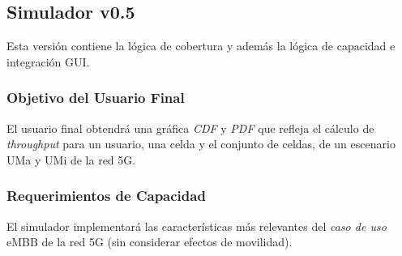 \begin{enumerate}
        \end{enumerate}
        

\subsection{Simulador v0.5}
Esta versión contiene la lógica de cobertura y además la lógica de capacidad e integración GUI.
\subsubsection{Objetivo del Usuario Final}
El usuario final obtendrá una gráfica \textit{CDF} y \textit{PDF} que refleja el cálculo de \textit{throughput} para un usuario, una celda y el conjunto de celdas, de un escenario UMa y UMi de la red 5G.

 \subsubsection{Requerimientos de Capacidad}

    El simulador implementará las características más relevantes del \textit{caso de uso} eMBB  de la red 5G (sin considerar efectos de movilidad).
    
